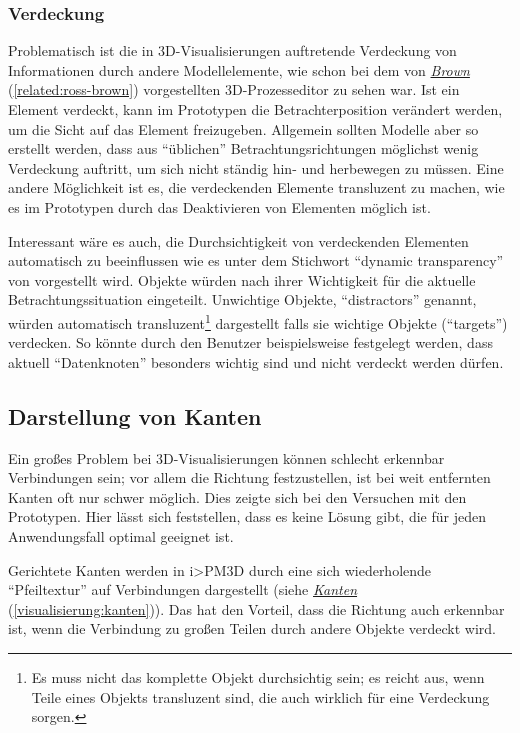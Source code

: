 \documentclass[a4paper,10pt]{sphinxmanual}
\begin{document}
\subsubsection{Verdeckung}
\label{visualisierung:verdeckung}
Problematisch ist die in 3D-Visualisierungen auftretende Verdeckung von Informationen durch andere Modellelemente, wie schon bei dem von {\hyperref[related:ross-brown]{\emph{Brown}}} (\autoref*{related:ross-brown}) vorgestellten 3D-Prozesseditor zu sehen war.
Ist ein Element verdeckt, kann im Prototypen die Betrachterposition verändert werden, um die Sicht auf das Element freizugeben.
Allgemein sollten Modelle aber so erstellt werden, dass aus "`üblichen"' Betrachtungsrichtungen möglichst wenig Verdeckung auftritt, um sich nicht ständig hin- und herbewegen zu müssen.
Eine andere Möglichkeit ist es, die verdeckenden Elemente transluzent zu machen, wie es im Prototypen durch das Deaktivieren von Elementen möglich ist.

Interessant wäre es auch, die Durchsichtigkeit von verdeckenden Elementen automatisch zu beeinflussen wie es unter dem Stichwort "`dynamic transparency"' von \cite{elmqvist_dynamic_2009} vorgestellt wird.
Objekte würden nach ihrer Wichtigkeit für die aktuelle Betrachtungssituation eingeteilt.
Unwichtige Objekte, "`distractors"' genannt, würden automatisch transluzent\footnote{
Es muss nicht das komplette Objekt durchsichtig sein; es reicht aus, wenn Teile eines Objekts transluzent sind, die auch wirklich für eine Verdeckung sorgen.
} dargestellt falls sie wichtige Objekte ("`targets"') verdecken.
So könnte durch den Benutzer beispielsweise festgelegt werden, dass aktuell "`Datenknoten"' besonders wichtig sind und nicht verdeckt werden dürfen.


\subsection{Darstellung von Kanten}
\label{visualisierung:darstellung-von-kanten}
Ein großes Problem bei 3D-Visualisierungen können schlecht erkennbar Verbindungen sein; vor allem die Richtung festzustellen, ist bei weit entfernten Kanten oft nur schwer möglich.
Dies zeigte sich bei den Versuchen mit den Prototypen.
Hier lässt sich feststellen, dass es keine Lösung gibt, die für jeden Anwendungsfall optimal geeignet ist.

Gerichtete Kanten werden in i\textgreater{}PM3D durch eine sich wiederholende "`Pfeiltextur"' auf Verbindungen dargestellt (siehe {\hyperref[visualisierung:kanten]{\emph{Kanten}}} (\autoref*{visualisierung:kanten})).
Das hat den Vorteil, dass die Richtung auch erkennbar ist, wenn die Verbindung zu großen Teilen durch andere Objekte verdeckt wird.
\end{document}
